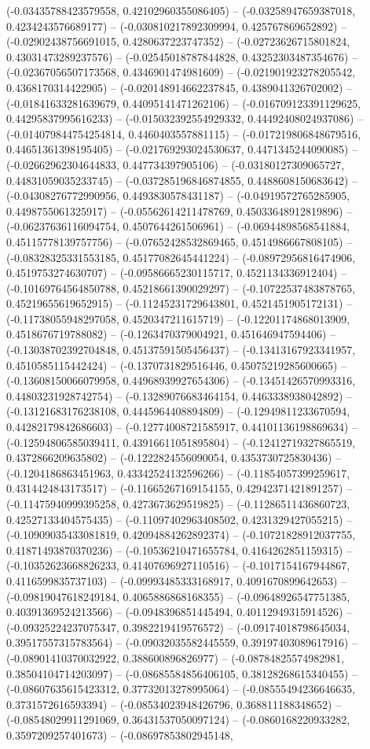 (-0.03435788423579558, 0.42102960355086405) -- (-0.03258947659387018, 0.4234243576689177) -- (-0.030810217892309994, 0.425767869652892) -- (-0.02902438756691015, 0.4280637223747352) -- (-0.02723626715801824, 0.43031473289237576) -- (-0.02545018787844828, 0.43252303487354676) -- (-0.02367056507173568, 0.4346901474981609) -- (-0.021901923278205542, 0.4368170314422905) -- (-0.020148914662237845, 0.4389041326702002) -- (-0.01841633281639679, 0.44095141471262106) -- (-0.016709123391129625, 0.44295837995616233) -- (-0.015032392554929332, 0.44492408024937086) -- (-0.014079844754254814, 0.4460403557881115) -- (-0.017219806848679516, 0.44651361398195405) -- (-0.021769293024530637, 0.4471345244090085) -- (-0.02662962304644833, 0.447734397905106) -- (-0.03180127309065727, 0.44831059035233745) -- (-0.037285196846874855, 0.4488608150683642) -- (-0.04308276772990956, 0.4493830578431187) -- (-0.04919572765285905, 0.4498755061325917) -- (-0.05562614211478769, 0.45033648912819896) -- (-0.06237636116094754, 0.4507644261506961) -- (-0.06944898568541884, 0.45115778139757756) -- (-0.07652428532869465, 0.4514986667808105) -- (-0.08328325331553185, 0.45177082645441224) -- (-0.08972956816474906, 0.4519753274630707) -- (-0.09586665230115717, 0.4521134336912404) -- (-0.10169764564850788, 0.45218661390029297) -- (-0.10722537483878765, 0.45219655619652915) -- (-0.11245231729643801, 0.4521451905172131) -- (-0.11738055948297058, 0.4520347211615719) -- (-0.12201174868013909, 0.4518676719788082) -- (-0.1263470379004921, 0.451646947594406) -- (-0.13038702392704848, 0.45137591505456437) -- (-0.13413167923341957, 0.4510585115442424) -- (-0.1370731829516446, 0.45075219285600665) -- (-0.13608150066079958, 0.44968939927654306) -- (-0.13451426570993316, 0.44803231928742754) -- (-0.13289076683464154, 0.4463338938042892) -- (-0.13121683176238108, 0.4445964408894809) -- (-0.12949811233670594, 0.44282179842686603) -- (-0.12774008721585917, 0.44101136198869634) -- (-0.12594806585039411, 0.43916611051895804) -- (-0.12412719327865519, 0.4372866209635802) -- (-0.1222824556090054, 0.4353730725830436) -- (-0.1204186863451963, 0.43342524132596266) -- (-0.11854057399259617, 0.4314424843173517) -- (-0.11665267169154155, 0.42942371421891257) -- (-0.11475940999395258, 0.4273673629519825) -- (-0.11286511436860723, 0.42527133404575435) -- (-0.11097402963408502, 0.4231329427055215) -- (-0.10909035433081819, 0.42094884262892374) -- (-0.10721828912037755, 0.41871493870370236) -- (-0.10536210471655784, 0.4164262851159315) -- (-0.10352623668826233, 0.41407696927110516) -- (-0.1017154167944867, 0.4116599835737103) -- (-0.09993485333168917, 0.4091670899642653) -- (-0.09819047618249184, 0.4065886868168355) -- (-0.09648926547751385, 0.40391369524213566) -- (-0.0948396851445494, 0.40112949315914526) -- (-0.09325224237075347, 0.3982219419576572) -- (-0.09174018798645034, 0.39517557315783564) -- (-0.09032035582445559, 0.39197403089617916) -- (-0.08901410370032922, 0.388600896826977) -- (-0.08784825574982981, 0.38504104714203097) -- (-0.08685584856406105, 0.38128268615340455) -- (-0.08607635615423312, 0.37732013278995064) -- (-0.08555494236646635, 0.3731572616593394) -- (-0.08534023948426796, 0.368811188348652) -- (-0.08548029911291069, 0.36431537050097124) -- (-0.0860168220933282, 0.3597209257401673) -- (-0.08697853802945148, 